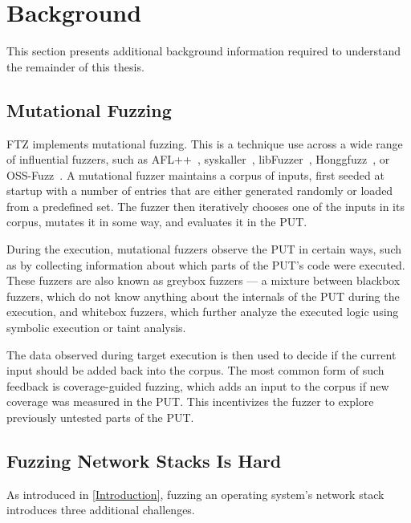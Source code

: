 \documentclass[twocolumn]{article}
\newcommand{\proj}{FTZ\xspace}
\let\savedCite=\cite
\renewcommand{\cite}{\unskip~\savedCite}
\begin{document}

\section{Background}
\label{Background}

This section presents additional background information required to understand the remainder of this thesis.

\subsection{Mutational Fuzzing}

\label{Background:MutationalFuzzing}
\proj implements mutational fuzzing. This is a technique use across a wide range of influential fuzzers, such as AFL++\cite{AFLPlusPlus}, syskaller\cite{syskaller}, libFuzzer\cite{libFuzzer}, Honggfuzz\cite{hongfuzz}, or OSS-Fuzz\cite{OSSFuzz}. A mutational fuzzer maintains a corpus of inputs, first seeded at startup with a number of entries that are either generated randomly or loaded from a predefined set. The fuzzer then iteratively chooses one of the inputs in its corpus, mutates it in some way, and evaluates it in the PUT.

During the execution, mutational fuzzers observe the PUT in certain ways, such as by collecting information about which parts of the PUT's code were executed. These fuzzers are also known as greybox fuzzers — a mixture between blackbox fuzzers, which do not know anything about the internals of the PUT during the execution, and whitebox fuzzers, which further analyze the executed logic using symbolic execution or taint analysis.\cite{EVA}

The data observed during target execution is then used to decide if the current input should be added back into the corpus. The most common form of such feedback is coverage-guided fuzzing, which adds an input to the corpus if new coverage was measured in the PUT. This incentivizes the fuzzer to explore previously untested parts of the PUT.\cite{AFLPlusPlus}

\subsection{Fuzzing Network Stacks Is Hard}
\label{Background:FuzzingNetworkStacksIsHard}

As introduced in \cref{Introduction}, fuzzing an operating system's network stack introduces three additional challenges.
\end{document}

